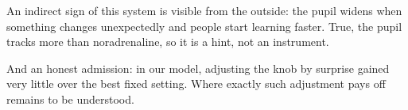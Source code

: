 An indirect sign of this system is visible from the outside: the pupil widens when something changes unexpectedly and people start learning faster. True, the pupil tracks more than noradrenaline, so it is a hint, not an instrument.

And an honest admission: in our model, adjusting the knob by surprise gained very little over the best fixed setting. Where exactly such adjustment pays off remains to be understood.

